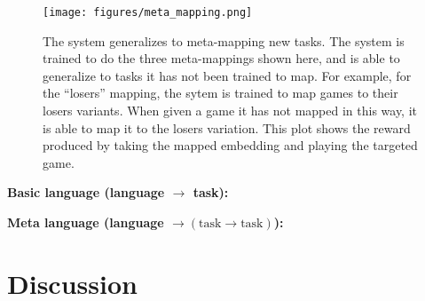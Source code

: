 \documentclass[11pt]{article}
\begin{document}
\begin{figure}
\centering
\texttt{[image: figures/meta\_mapping.png]}
\caption{The system generalizes to meta-mapping new tasks. The system is trained to do the three meta-mappings shown here, and is able to generalize to tasks it has not been trained to map. For example, for the ``losers'' mapping, the sytem is trained to map games to their losers variants. When given a game it has not mapped in this way, it is able to map it to the losers variation. This plot shows the reward produced by taking the mapped embedding and playing the targeted game.}
\label{cards_meta_map_results}
\end{figure}
\textbf{Basic language (language $\rightarrow$ task):} \par
\textbf{Meta language (language $\rightarrow (\text{task} \rightarrow \text{task})$):} \par


\section{Discussion}
\end{document}
